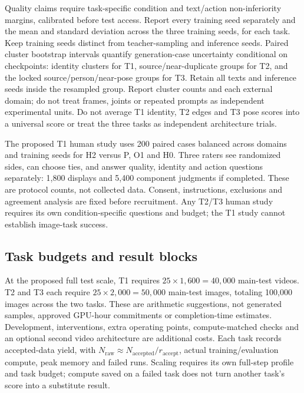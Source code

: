 \documentclass{article}
\begin{document}
Quality claims require task-specific condition and text/action non-inferiority margins, calibrated before test access. Report every training seed separately and the mean and standard deviation across the three training seeds, for each task. Keep training seeds distinct from teacher-sampling and inference seeds. Paired cluster bootstrap intervals quantify generation-case uncertainty conditional on checkpoints: identity clusters for T1, source/near-duplicate groups for T2, and the locked source/person/near-pose groups for T3. Retain all texts and inference seeds inside the resampled group. Report cluster counts and each external domain; do not treat frames, joints or repeated prompts as independent experimental units. Do not average T1 identity, T2 edges and T3 pose scores into a universal score or treat the three tasks as independent architecture trials.

The proposed T1 human study uses 200 paired cases balanced across domains and training seeds for H2 versus P, O1 and H0. Three raters see randomized sides, can choose ties, and answer quality, identity and action questions separately: 1,800 displays and 5,400 component judgments if completed. These are protocol counts, not collected data. Consent, instructions, exclusions and agreement analysis are fixed before recruitment. Any T2/T3 human study requires its own condition-specific questions and budget; the T1 study cannot establish image-task success.

\subsection{Task budgets and result blocks}
At the proposed full test scale, T1 requires $25\times1{,}600=40{,}000$ main-test videos. T2 and T3 each require $25\times2{,}000=50{,}000$ main-test images, totaling 100,000 images across the two tasks. These are arithmetic suggestions, not generated samples, approved GPU-hour commitments or completion-time estimates. Development, interventions, extra operating points, compute-matched checks and an optional second video architecture are additional costs. Each task records accepted-data yield, with $N_{\mathrm{raw}}\approx N_{\mathrm{accepted}}/r_{\mathrm{accept}}$, actual training/evaluation compute, peak memory and failed runs. Scaling requires its own full-step profile and task budget; compute saved on a failed task does not turn another task's score into a substitute result.
\end{document}
